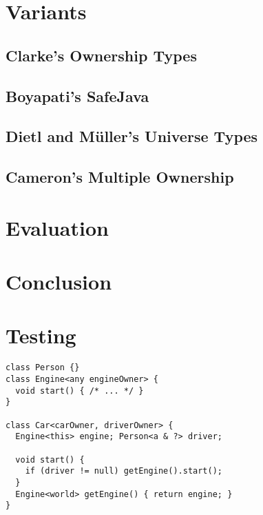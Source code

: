 \documentclass{acm_proc_article-sp}
\begin{document}
\section{Variants}
\label{sec:variants}

\subsection{Clarke's Ownership Types}
\label{subsec:clarke}

\subsection{Boyapati's SafeJava}
\label{subsec:boyapati}

\subsection{Dietl and M\"{u}ller's Universe Types}
\label{subsec:dietl}

\subsection{Cameron's Multiple Ownership}
\label{subsec:cameron}




\section{Evaluation}
\label{sec:eval}

\lipsum[6]




\section{Conclusion}
\label{sec:conclude}

\lipsum[8]








\section{Testing}
\label{sec:test}

\begin{lstlisting}[caption={Car Engine Example},label=code:car_eng_test]
class Person {}
class Engine<any engineOwner> {
  void start() { /* ... */ }
}

class Car<carOwner, driverOwner> {
  Engine<this> engine; Person<a & ?> driver;
    
  void start() {
    if (driver != null) getEngine().start();
  }
  Engine<world> getEngine() { return engine; }
}
\end{lstlisting}
\end{document}
